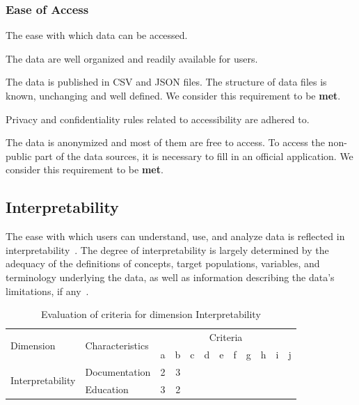 \subsubsection{Ease of Access}

The ease with which data can be accessed.

\begin{QandA}
    \item The data are well organized and readily available for users.
    \begin{answered}
        The data is published in CSV and JSON files.
        The structure of data files is known, unchanging and well defined.
        We consider this requirement to be \textbf{met}.
    \end{answered}

    \item Privacy and confidentiality rules related to accessibility are adhered to.
    \begin{answered}
        The data is anonymized and most of them are free to access.
        To access the non-public part of the data sources, it is necessary to fill in an official application.
        We consider this requirement to be \textbf{met}.
    \end{answered}

\end{QandA}

\newpage
\subsection{Interpretability}

The ease with which users can understand, use, and analyze data is reflected in interpretability~\cite{oecd}.
The degree of interpretability is largely determined by the adequacy of the definitions of concepts, target populations, variables, and terminology underlying the data, as well as information describing the data's limitations, if any~\cite{oecd}.

\begin{table}[htbp]
    \centering

    \begin{tabular}{llrrrrrrrrrr}
        \toprule
        \multirow{2}{*}{Dimension}          & \multirow{2}{*}{Characteristics}  & \multicolumn{10}{c}{Criteria}         \\ \cmidrule(lr){3-12}
                                            &                                   & a & b & c & d & e & f & g & h & i & j \\ \midrule
        \multirow{2}{*}{Interpretability}   & Documentation                     & 2 & 3 &   &   &   &   &   &   &   &   \\
                                            & Education                         & 3 & 2 &   &   &   &   &   &   &   &   \\
        \bottomrule
    \end{tabular}

    \caption{Evaluation of criteria for dimension Interpretability}
    \label{table:interpretability-benchmark}
\end{table}
\FloatBarrier

